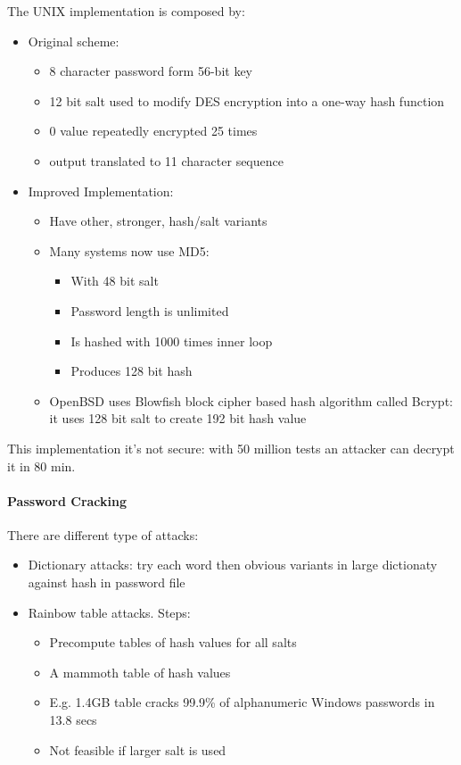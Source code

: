 The UNIX implementation is composed by:
\begin{itemize}
  \item Original scheme:
  \begin{itemize}
    \item 8 character password form 56-bit key
    \item 12 bit salt used to modify DES encryption into a one-way hash function
    \item 0 value repeatedly encrypted 25 times
    \item output translated to 11 character sequence
  \end{itemize}
  \item Improved Implementation:
  \begin{itemize}
    \item Have other, stronger, hash/salt variants
    \item Many systems now use MD5:
    \begin{itemize}
      \item With 48 bit salt
      \item Password length is unlimited
      \item Is hashed with 1000 times inner loop
      \item Produces 128 bit hash
    \end{itemize}
    \item OpenBSD uses Blowfish block cipher based hash algorithm called
Bcrypt: it uses 128 bit salt to create 192 bit hash value
  \end{itemize}
\end{itemize}
This implementation it's not secure: with 50 million tests an attacker can
decrypt it in 80 min.

\paragraph*{Password Cracking}
There are different type of attacks:
\begin{itemize}
  \item Dictionary attacks: try each word then obvious variants in large
dictionaty against hash in password file
  \item Rainbow table attacks. Steps:
  \begin{itemize}
    \item Precompute tables of hash values for all salts
    \item A mammoth table of hash values
    \item E.g. 1.4GB table cracks 99.9\% of alphanumeric Windows passwords in
13.8 secs
    \item Not feasible if larger salt is used
  \end{itemize}
\end{itemize}

